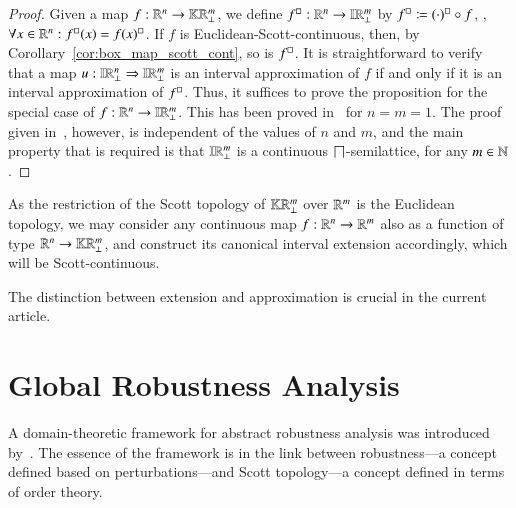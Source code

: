 \documentclass[11pt,times]{article}
\begin{document}
\begin{proof}
  Given a map $f : \R^n \to \kCPPO{\R^m\lift}$, we define
  $\hbClos{f}: \R^n \to \intvaldom[\R^m\lift]$ by
  $\hbClos{f} \defeq \hbClos{(\cdot)} \circ f$, {\ie},
  $\forall x \in \R^n: \hbClos{f}(x) = \hbClos{f(x)}$. If $f$ is
  Euclidean-Scott-continuous, then, by
  Corollary~\ref{cor:box_map_scott_cont}, so is $\hbClos{f}$. It is
  straightforward to verify that a map
  $u: \intvaldom[\R^n\lift] \Rightarrow \intvaldom[\R^m\lift]$ is an
  interval approximation of $f$ if and only if it is an interval
  approximation of $\hbClos{f}$. Thus, it suffices to prove the
  proposition for the special case of
  $f: \R^n \to \intvaldom[\R^m\lift]$. This has been proved
  in~\parencite[Lemma~3.4]{Edalat_Escardo:Integ_realPCF:2000} for
  $n = m = 1$. The proof given
  in~\parencite{Edalat_Escardo:Integ_realPCF:2000}, however, is
  independent of the values of $n$ and $m$, and the main property that
  is required is that $\intvaldom[\R^m\lift]$ is a continuous
  $\glb$-semilattice, for any $m \in \N$.
\end{proof}


As the restriction of the Scott topology of $\kCPPO{\R^m\lift}$ over
$\R^m$ is the Euclidean topology, we may consider any continuous map
$f: \R^n \to \R^m$ also as a function of type
$\R^n \to \kCPPO{\R^m\lift}$, and construct its canonical interval extension
accordingly, which will be Scott-continuous.


\begin{remark}
  The distinction between extension and approximation is crucial in
  the current article.
\end{remark}



  \section{Global Robustness Analysis}
  \label{sec:global_robustness_analysis}


  
A domain-theoretic framework for abstract robustness analysis was
introduced
by~\textcite{Moggi_Farjudian_Duracz_Taha:Reachability_Hybrid:2018}. The
essence of the framework is in the link between robustness---a concept
defined based on perturbations---and Scott topology---a concept
defined in terms of order theory. 
\end{document}
